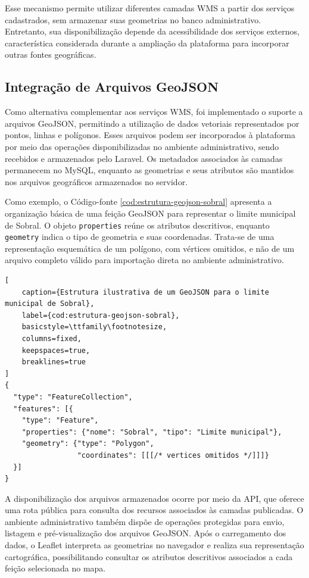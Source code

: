 Esse mecanismo permite utilizar diferentes camadas WMS a partir dos serviços cadastrados, sem armazenar suas geometrias no banco administrativo. Entretanto, sua disponibilização depende da acessibilidade dos serviços externos, característica considerada durante a ampliação da plataforma para incorporar outras fontes geográficas.

\subsection{Integração de Arquivos GeoJSON}
\label{sec:integracao-geojson}

Como alternativa complementar aos serviços WMS, foi implementado o suporte a arquivos GeoJSON, permitindo a utilização de dados vetoriais representados por pontos, linhas e polígonos. Esses arquivos podem ser incorporados à plataforma por meio das operações disponibilizadas no ambiente administrativo, sendo recebidos e armazenados pelo Laravel. Os metadados associados às camadas permanecem no MySQL, enquanto as geometrias e seus atributos são mantidos nos arquivos geográficos armazenados no servidor.

Como exemplo, o Código-fonte \ref{cod:estrutura-geojson-sobral} apresenta a organização básica de uma feição GeoJSON para representar o limite municipal de Sobral. O objeto \texttt{properties} reúne os atributos descritivos, enquanto \texttt{geometry} indica o tipo de geometria e suas coordenadas. Trata-se de uma representação esquemática de um polígono, com vértices omitidos, e não de um arquivo completo válido para importação direta no ambiente administrativo.

\begin{lstlisting}[
    caption={Estrutura ilustrativa de um GeoJSON para o limite municipal de Sobral},
    label={cod:estrutura-geojson-sobral},
    basicstyle=\ttfamily\footnotesize,
    columns=fixed,
    keepspaces=true,
    breaklines=true
]
{
  "type": "FeatureCollection",
  "features": [{
    "type": "Feature",
    "properties": {"nome": "Sobral", "tipo": "Limite municipal"},
    "geometry": {"type": "Polygon",
                 "coordinates": [[[/* vertices omitidos */]]]}
  }]
}
\end{lstlisting}

A disponibilização dos arquivos armazenados ocorre por meio da API, que oferece uma rota pública para consulta dos recursos associados às camadas publicadas. O ambiente administrativo também dispõe de operações protegidas para envio, listagem e pré-visualização dos arquivos GeoJSON. Após o carregamento dos dados, o Leaflet interpreta as geometrias no navegador e realiza sua representação cartográfica, possibilitando consultar os atributos descritivos associados a cada feição selecionada no mapa.

